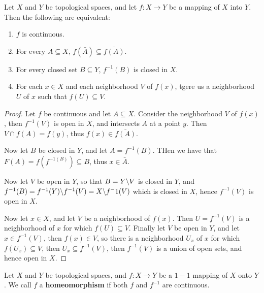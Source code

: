 \begin{theorem}\label{1.7.1}
    Let $X$ and  $Y$ be topological spaces, and let  $f:X \rightarrow Y$ be a mapping of  $X$ into
    $Y$. Then the following are equivalent:
        \begin{enumerate}[label=(\arabic*)]
            \item $f$ is continuous.

            \item For every $A \subseteq X$,  $f(\bar{A}) \subseteq \bar{f(A)}$.

            \item For every closed set $B \subseteq Y$,  $f^{-1}(B)$ is closed in $X$.

            \item For each  $x \in X$ and each neighborhood  $V$ of  $f(x)$, tgere us a neighborhood
                $U$ of  $x$ such that  $f(U) \subseteq V$.
        \end{enumerate}
\end{theorem}
\begin{proof}
    Let $f$ be continuous and let  $A \subseteq X$. Consider the neighborhood  $V$ of  $f(x)$, then
    $f^{-1}(V)$ is open in $X$, and intersects  $A$ at a point  $y$. Then  $V \cap f(A)=f(y)$, thus 
    $f(x) \in \bar{f(A)}$.

    Now let $B$ be closed in  $Y$, and let  $A=f^{-1}(B)$. THen we have that $F(A)=f(f^{-1(B)})
    \subseteq B$, thus $x \in \bar{A}$.

    Now let $V$ be open in $Y$, so that  $B=Y \backslash V$ is closed in $Y$, and
    $f^{-1}(B)=f^{-1}(Y) \backslash f^{-1}(V)=X \backslash f^-1(V)$ which is closed in $X$, hence
    $f^{-1}(V)$ is open in $X$.

    Now let  $x \in X$, and let  $V$ be a neighborhood of  $f(x)$. Then $U=f^{-1}(V)$ is a
    neighborhood of $x$ for which  $f(U) \subseteq V$. Finally let $V$ be open in  $Y$, and let $x
    \in f^{-1}(V)$, then $f(x) \in V$, so  there is a neighborhood $U_x$ of  $x$ for which  $f(U_x) \subseteq V$,
    then $U_x \subseteq f^{-1}(V)$, then $f^{-1}(V)$ is a union of open sets, and hence open in $X$.
\end{proof}

\begin{definition}
    Let $X$ and  $Y$ be topological spaces, and  $f:X \rightarrow Y$ be a $1-1$ mapping of  $X$ onto
    $Y$. We call  $f$ a \textbf{homeomorphism} if both $f$ and  $f^{-1}$ are continuous.		
\end{definition}

